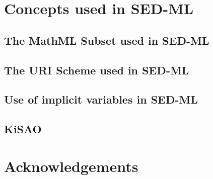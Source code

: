 \documentclass[11pt]{article}
\begin{document}

\tableofcontents
\newpage


  

  
  \section{Concepts used in SED-ML}

  \subsection{The MathML Subset used in SED-ML}
  

  \subsection{The URI Scheme used in SED-ML}  
  
  
  \subsection{Use of implicit variables in SED-ML}
  

  \subsection{KiSAO}
  

  

  


  

\section*{Acknowledgements}

\end{document}
